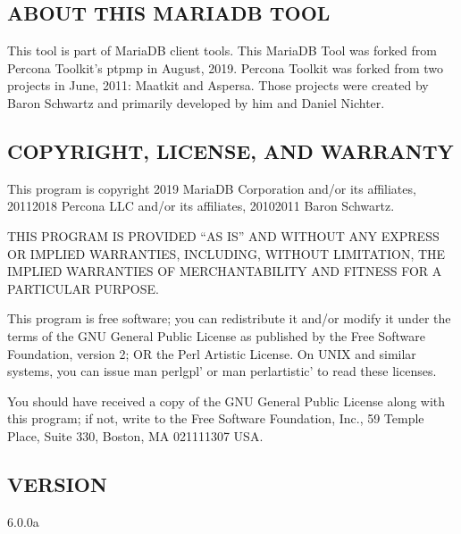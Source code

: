 \documentclass[letterpaper,10pt,english]{sphinxmanual}
\begin{document}
\section{ABOUT THIS MARIADB TOOL}
\label{\detokenize{mariadb-stacktrace:about-this-mariadb-tool}}
\sphinxAtStartPar
This tool is part of MariaDB client tools. This MariaDB Tool was forked from
Percona Toolkit’s pt\sphinxhyphen{}pmp in August, 2019. Percona Toolkit was forked from two
projects in June, 2011: Maatkit and Aspersa.  Those projects were created by
Baron Schwartz and primarily developed by him and Daniel Nichter.


\section{COPYRIGHT, LICENSE, AND WARRANTY}
\label{\detokenize{mariadb-stacktrace:copyright-license-and-warranty}}
\sphinxAtStartPar
This program is copyright 2019 MariaDB Corporation and/or its affiliates,
2011\sphinxhyphen{}2018 Percona LLC and/or its affiliates, 2010\sphinxhyphen{}2011 Baron Schwartz.

\sphinxAtStartPar
THIS PROGRAM IS PROVIDED “AS IS” AND WITHOUT ANY EXPRESS OR IMPLIED
WARRANTIES, INCLUDING, WITHOUT LIMITATION, THE IMPLIED WARRANTIES OF
MERCHANTABILITY AND FITNESS FOR A PARTICULAR PURPOSE.

\sphinxAtStartPar
This program is free software; you can redistribute it and/or modify it under
the terms of the GNU General Public License as published by the Free Software
Foundation, version 2; OR the Perl Artistic License.  On UNIX and similar
systems, you can issue \textasciigrave{}man perlgpl’ or \textasciigrave{}man perlartistic’ to read these
licenses.

\sphinxAtStartPar
You should have received a copy of the GNU General Public License along with
this program; if not, write to the Free Software Foundation, Inc., 59 Temple
Place, Suite 330, Boston, MA  02111\sphinxhyphen{}1307  USA.


\section{VERSION}
\label{\detokenize{mariadb-stacktrace:version}}
\sphinxAtStartPar
{} 6.0.0a


\chapter{}
\label{\detokenize{mariadb-stat:mariadb-stat}}\label{\detokenize{mariadb-stat::doc}}
\end{document}
